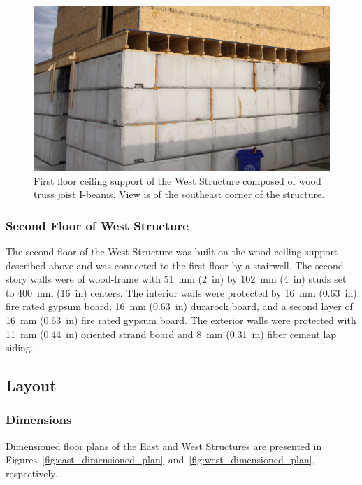 \documentclass[12pt,oneside]{book}
\begin{document}
\begin{figure}[!ht]
	\includegraphics[width=6in]{../../Hose_Stream_Tests/Figures/Pictures/TJI_support}
	\caption[Ceiling support of the West Structure.]{First floor ceiling support of the West Structure composed of wood truss joist I-beams. View is of the southeast corner of the structure.}
	\label{fig:TJI}
\end{figure}
\FloatBarrier

\subsubsection{Second Floor of West Structure}
The second floor of the West Structure was built on the wood ceiling support described above and was connected to the first floor by a stairwell. The second story walls were of wood-frame with 51~mm (2~in) by 102~mm (4~in) studs set to 400~mm (16~in) centers. The interior walls were protected by 16~mm (0.63~in) fire rated gypsum board, 16~mm (0.63~in) durarock board, and a second layer of 16~mm (0.63~in) fire rated gypsum board. The exterior walls were protected with 11~mm (0.44~in) oriented strand board and 8~mm (0.31~in) fiber cement lap siding.

\subsection{Layout}
\label{sec:layout}

\subsubsection{Dimensions}
Dimensioned floor plans of the East and West Structures are presented in Figures~\ref{fig:east_dimensioned_plan}~and~\ref{fig:west_dimensioned_plan}, respectively.
\end{document}
